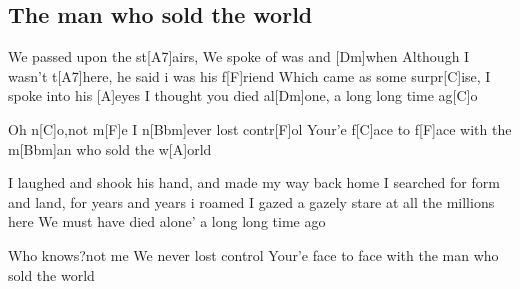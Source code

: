 \subsection*{The man who sold the world   }
\begin{guitar}
[(Dm)]We passed upon the st[A7]airs, We spoke of was and [Dm]when
Although I wasn't t[A7]here, he said i was his f[F]riend
Which came as some surpr[C]ise, I spoke into his [A]eyes
I thought you died al[Dm]one, a long long time ag[C]o



Oh n[C]o,\qquad not m[F]e
I n[Bbm]ever lost contr[F]ol
Your'e f[C]ace      to f[F]ace
with the m[Bbm]an who sold the w[A]orld



I laughed and shook his hand, and made my way back home
I searched for form and land, for years and years i roamed
I gazed a gazely stare at all the millions here
We must have died alone' a long long time ago



Who knows?\qquad not me
We never lost control
Your'e face to face
with the man who sold the world
\end{guitar}
